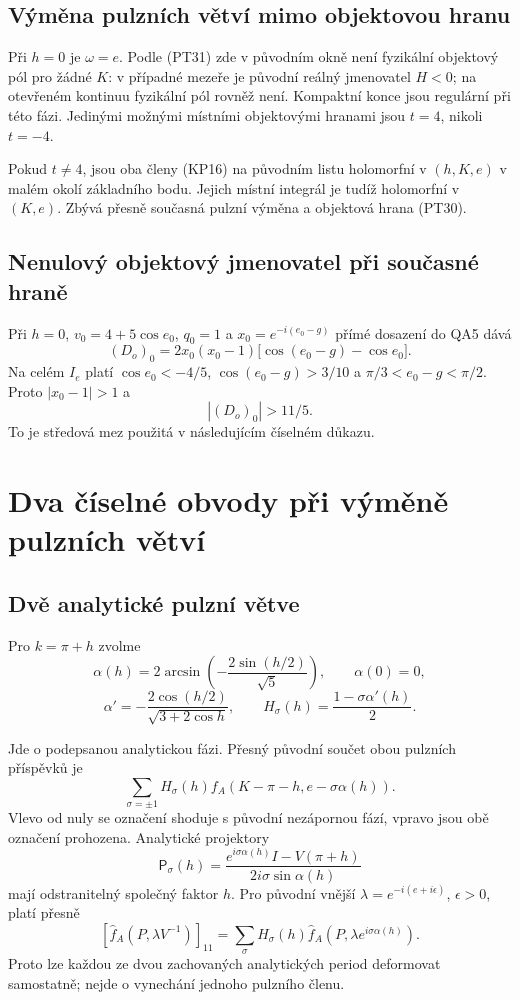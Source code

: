 \documentclass[11pt,a4paper]{article}
\theoremstyle{remark}\newtheorem{remark}[theorem]{Poznámka}
\numberwithin{equation}{section}
\begin{document}
\hypertarget{vuxfdmux11bna-pulznuxedch-vux11btvuxed-mimo-objektovou-hranu}{%
\subsection{Výměna pulzních větví mimo objektovou
hranu}\label{vuxfdmux11bna-pulznuxedch-vux11btvuxed-mimo-objektovou-hranu}}

Při \(h=0\) je \(\omega=e\). Podle (PT31) zde v původním okně není
fyzikální objektový pól pro žádné \(K\): v případné mezeře je původní
reálný jmenovatel \(H<0\); na otevřeném kontinuu fyzikální pól rovněž
není. Kompaktní konce jsou regulární při této fázi. Jedinými možnými
místními objektovými hranami jsou \(t=4\), nikoli \(t=-4\).

Pokud \(t\ne4\), jsou oba členy (KP16) na původním listu holomorfní v
\((h,K,e)\) v malém okolí základního bodu. Jejich místní integrál je
tudíž holomorfní v \((K,e)\). Zbývá přesně současná pulzní výměna a
objektová hrana (PT30).

\subsection{Nenulový objektový jmenovatel při současné hraně}
Při \(h=0\), \(v_0=4+5\cos e_0\), \(q_0=1\) a
\(x_0=e^{-i(e_0-g)}\) přímé dosazení do QA5 dává
\[
(D_o)_0=2x_0(x_0-1)
\bigl[\cos(e_0-g)-\cos e_0\bigr].\tag{KP21}
\]
Na celém \(I_e\) platí
\(\cos e_0<-4/5\), \(\cos(e_0-g)>3/10\) a
\(\pi/3<e_0-g<\pi/2\). Proto \(|x_0-1|>1\) a
\[
|(D_o)_0|>11/5.\tag{KP22}
\]
To je středová mez použitá v následujícím číselném důkazu.

\section{Dva číselné obvody při výměně pulzních větví}
\hypertarget{dvux11b-analytickuxe9-pulznuxed-vux11btve}{%
\subsection{Dvě analytické pulzní
větve}\label{dvux11b-analytickuxe9-pulznuxed-vux11btve}}

Pro \(k=\pi+h\) zvolme \[
\alpha(h)=2\arcsin\left(-\frac{2\sin(h/2)}{\sqrt5}\right),\qquad
\alpha(0)=0,
\] \[
\alpha'=-\frac{2\cos(h/2)}{\sqrt{3+2\cos h}},
\qquad H_\sigma(h)=\frac{1-\sigma\alpha'(h)}2.
\tag{QB1}
\]

Jde o podepsanou analytickou fázi. Přesný původní součet obou pulzních
příspěvků je \[
\sum_{\sigma=\pm1}H_\sigma(h)
f_A(K-\pi-h,e-\sigma\alpha(h)).
\tag{QB2}
\] Vlevo od nuly se označení shoduje s původní nezápornou fází, vpravo
jsou obě označení prohozena. Analytické projektory \[
\mathsf P_\sigma(h)=
\frac{e^{i\sigma\alpha(h)}I-V(\pi+h)}
{2i\sigma\sin\alpha(h)}
\] mají odstranitelný společný faktor \(h\). Pro původní vnější
\(\lambda=e^{-i(e+i\epsilon)}\), \(\epsilon>0\), platí přesně \[
[\widehat f_A(P,\lambda V^{-1})]_{11}
=\sum_\sigma H_\sigma(h)
\widehat f_A(P,\lambda e^{i\sigma\alpha(h)}).
\tag{QB3}
\] Proto lze každou ze dvou zachovaných analytických period deformovat
samostatně; nejde o vynechání jednoho pulzního členu.
\end{document}
